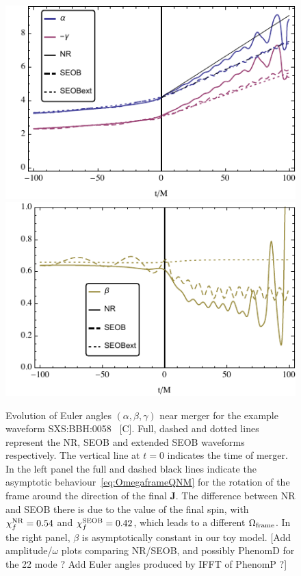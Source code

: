 \documentclass[aps,showpacs,twocolumn,
prd,superscriptaddress,nofootinbib]{revtex4-1}
\newcommand{\SM}[1]{{\color{Red} #1}}
\begin{document}
\begin{figure}
  \centering
  \includegraphics[width=.45\linewidth]{plots/eulerSXS0058alphagamma.pdf}
  \hspace{0.2cm}
  \includegraphics[width=.45\linewidth]{plots/eulerSXS0058beta.pdf}
  \caption{Evolution of Euler angles $(\alpha, \beta, \gamma)$ near merger for the example waveform SXS:BBH:0058~\cite{} \SM{[C]}. Full, dashed and dotted lines represent the NR, SEOB and extended SEOB waveforms respectively. The vertical line at $t=0$ indicates the time of merger. In the left panel the full and dashed black lines indicate the asymptotic behaviour~\eqref{eq:OmegaframeQNM} for the rotation of the frame around the direction of the final $\bm{J}$. The difference between NR and SEOB there is due to the value of the final spin, with $\chi_{f}^{\rm NR} = 0.54$ and $\chi_{f}^{\rm SEOB} = 0.42$, which leads to a different $\Omega_{\rm frame}$. In the right panel, $\beta$ is asymptotically constant in our toy model. \SM{[Add amplitude/$\omega$ plots comparing NR/SEOB, and possibly PhenomD for the 22 mode ? Add Euler angles produced by IFFT of PhenomP ?]}}
  \label{fig:prectoymodel}
\end{figure}

\end{document}
